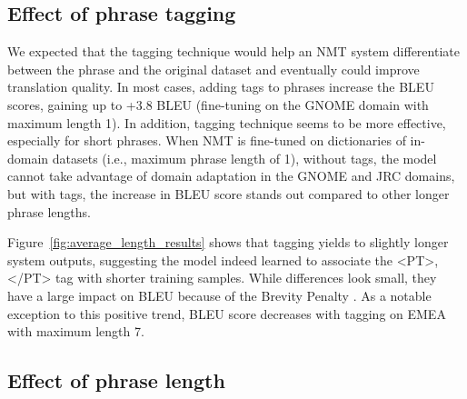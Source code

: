 \subsection{Effect of phrase tagging}%

We expected that the tagging technique would help an NMT system differentiate between the phrase and the original dataset and eventually could improve translation quality. In most cases, adding tags to phrases increase the BLEU scores, gaining up to +3.8 BLEU (fine-tuning on the GNOME domain with maximum length 1).
In addition, tagging technique seems to be more effective, especially for short phrases. When NMT is fine-tuned on dictionaries of in-domain datasets (i.e., maximum phrase length of 1), without tags, the model cannot take advantage of domain adaptation in the GNOME and JRC domains, but with tags, the increase in BLEU score stands out compared to other longer phrase lengths.

Figure~\ref{fig:average_length_results} shows that tagging yields to slightly longer system outputs, suggesting the model indeed learned to associate the <PT>, </PT> tag with shorter training samples.
While differences look small, they have a large impact on BLEU because of the Brevity Penalty \parencite{papineni-etal-2002-bleu}.
As a notable exception to this positive trend, BLEU score decreases with tagging on EMEA with maximum length 7. 

\subsection{Effect of phrase length}\label{section:effect_phrase_length}

